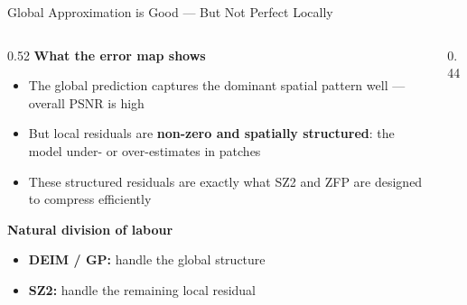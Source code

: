 \documentclass[aspectratio=169, 11pt]{beamer}
\begin{document}
\begin{frame}{Global Approximation is Good --- But Not Perfect Locally}
\begin{columns}[T]

\begin{column}{0.52\textwidth}
  \textcolor{cteal}{\textbf{What the error map shows}}\vspace{0.3em}
  \begin{itemize}\setlength\itemsep{0.35em}\small
    \item The global prediction captures the dominant spatial pattern well --- overall PSNR is high
    \item But local residuals are \textbf{non-zero and spatially structured}: the model under- or over-estimates in patches
    \item These structured residuals are exactly what SZ2 and ZFP are designed to compress efficiently
  \end{itemize}

  \vspace{0.5em}
  \textcolor{cteal}{\textbf{Natural division of labour}}\vspace{0.3em}
  \begin{itemize}\setlength\itemsep{0.35em}\small
    \item \textbf{DEIM / GP:} handle the global structure
    \item \textbf{SZ2:} handle the remaining local residual
  \end{itemize}
\end{column}

\begin{column}{0.44\textwidth}
  \vspace{0.5em}
\end{column}

\end{columns}
\end{frame}
\end{document}
